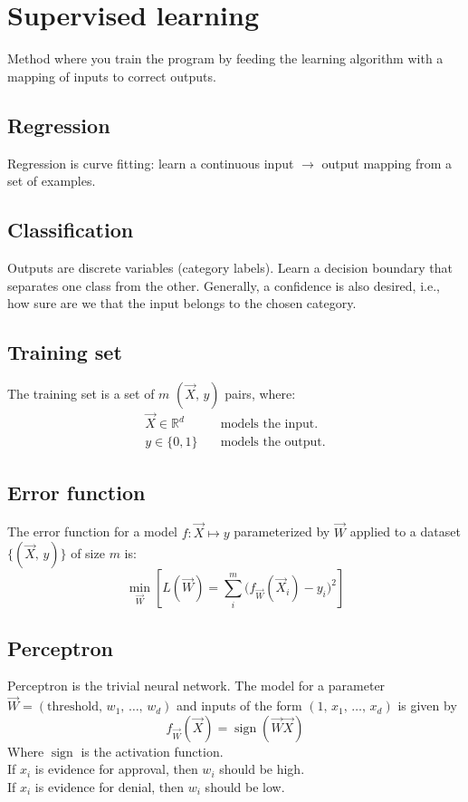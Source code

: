\documentclass[11pt]{article}
\date{\today}
\title{}
\DeclareMathOperator{\sign}{sign}
\begin{document}
\section{Supervised learning}
\label{sec:orgb17e083}
Method where you train the program by feeding the learning algorithm with a mapping of
inputs to correct outputs.
\subsection{Regression}
\label{sec:org77518e2}
Regression is curve fitting: learn a continuous input \(\to\) output mapping from a set of
examples.
\subsection{Classification}
\label{sec:org7ba2ef9}
Outputs are discrete variables (category labels). Learn a decision boundary that
separates one class from the other. Generally, a confidence is also desired, i.e.,
how sure are we that the input belongs to the chosen category.
\subsection{Training set}
\label{sec:orgbc26ef5}
The training set is a set of \(m\) \((\vec{X},\, y)\) pairs, where:
\begin{align*}
  \vec{X} \in \mathbb{R}^d & \quad\text{models the input.} \\
  y \in \{0, 1\} & \quad\text{models the output.}
\end{align*}
\subsection{Error function}
\label{sec:orgf3f8320}
The error function for a model \(f: \vec{X} \mapsto y\) parameterized by \(\vec{W}\) applied to a
dataset \(\{ (\vec{X},\, y) \}\) of size \(m\) is:
\[
  \min_{\vec{W}} \left[ L(\vec{W}) = \sum^m_i{ \big(f_{\vec{W}}(\vec{X}_i) - y_i \big)^2 } \right]
\]
\subsection{Perceptron}
\label{sec:org40d0a26}
Perceptron is the trivial neural network. The model for a parameter \(\vec{W} = (\text{threshold},\,
   w_1,\, \hdots,\, w_d)\) and inputs of the form \((1,\, x_1,\, \hdots,\, x_d)\) is given by
\[
  f_{\vec{W}}(\vec{X}) = \sign(\vec{W} \vec{X})
\]
Where \(\sign\) is the activation function. \\
If \(x_i\) is evidence for approval, then \(w_i\) should be high. \\
If \(x_i\) is evidence for denial, then \(w_i\) should be low.
\end{document}

